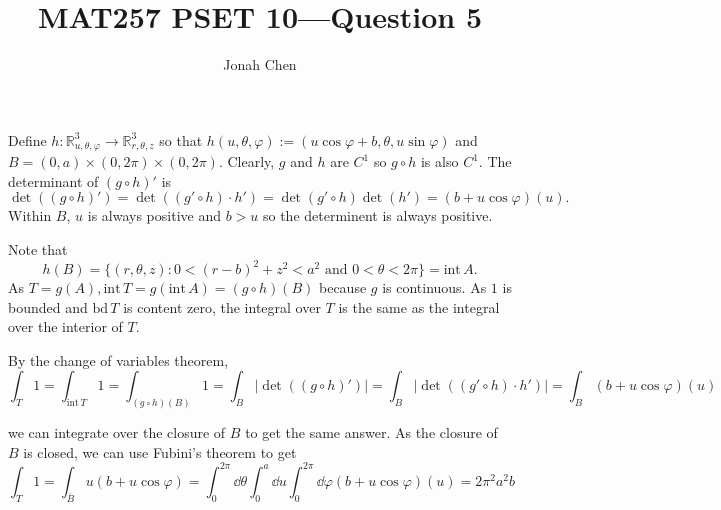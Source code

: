 \documentclass{exam}
\title{MAT257 PSET 10---Question 5}
\author{Jonah Chen}
\date{}
\numberwithin{equation}{section}
\newcommand{\R}{\mathbb{R}}
\begin{document}
    \sffamily
    \maketitle
    Define \(h:\R^3_{u,\theta,\varphi}\to\R^3_{r,\theta,z}\) so that \(h(u,\theta,\varphi):=(u\cos\varphi+b,\theta,u\sin\varphi)\) and \(B=(0,a)\times(0,2\pi)\times(0,2\pi).\) Clearly, \(g\) and \(h\) are \(C^1\) so \(g\circ h\) is also
    \(C^1.\) The determinant of \((g\circ h)'\) is
    \[\det((g\circ h)')=\det((g'\circ h)\cdot h')=\det(g'\circ h)\det(h')=(b+u\cos\varphi)(u).\]
    Within \(B\), \(u\) is always positive and \(b>u\) so the determinent is always positive. 
    
    Note that \[h(B)=\{(r,\theta,z):0<(r-b)^2+z^2<a^2\text{ and }0<\theta<2\pi\}=\mathrm{int}\,A.\] As \(T=g(A),\mathrm{int}\,T=g(\mathrm{int}\,A)=(g\circ h)(B)\) because \(g\) is continuous. As \(1\) is bounded and \(\mathrm{bd}\,T\) is content zero, the integral over \(T\) is the same as the integral over the interior of \(T.\)

    By the change of variables theorem, \[\int_T1=\int_{\mathrm{int}\,T}1=\int_{(g\circ h)(B)}1=\int_{B}|\det((g\circ h)')|=\int_B|\det((g'\circ h)\cdot h')|=\int_B(b+u\cos\varphi)(u)\]

    we can integrate over the closure of \(B\) to get the same answer. As the closure of \(B\) is closed, we can use Fubini's theorem to get 
    \[\int_T1=\int_{\overline B}u(b+u\cos\varphi)=\int_0^{2\pi}\dd \theta\int_0^a\dd u\int_0^{2\pi}\dd\varphi(b+u\cos\varphi)(u)=2\pi^2a^2b\]
\end{document}
